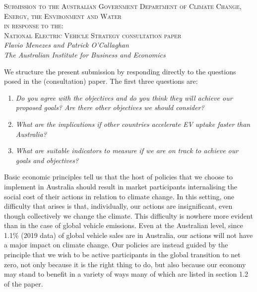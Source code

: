 \documentclass[12pt, draft]{article} \usepackage[shortlabels]{enumitem}
\begin{document}
\begin{centering}
  \textsc{Submission to the Australian Government Department of Climate Change,
  Energy, the Environment and Water\\ in response to the:\\
  National Electric Vehicle Strategy consultation paper}\\
\vskip10pt
  \emph{Flavio Menezes and Patrick O'Callaghan\\
  The Australian Institute for Business and Economics}\\
\end{centering}
\vskip20pt

We structure the present submission by responding directly to the
questions posed in the (consultation) paper. The first three questions are: 

\begin{enumerate}
 
  \item \emph{Do you agree with the objectives and do you think
      they will achieve our proposed goals? Are there other objectives we
      should consider?}

  \item \emph{What are the implications if other countries accelerate EV
    uptake faster than Australia?}

  \item \emph{What are suitable indicators to measure if we are on track to
    achieve our goals and objectives?}

\end{enumerate}

Basic economic principles tell us that the host of policies that we choose to
implement in Australia should result in market participants internalising the
social cost of their actions in relation to climate change. In this setting,
one difficulty that arises is that, individually, our actions are
insignificant, even though collectively we change the climate.  This difficulty
is nowhere more evident than in the case of global vehicle emissions.  Even at
the Australian level, since 1.1\% (2019 data) of global vehicle sales are in
Australia, our actions will not have a major impact on climate change. Our
policies are instead guided by the principle that we wish to be active
participants in the global transition to net zero, not only because it is the
right thing to do, but also because our economy may stand to benefit in a
variety of ways many of which are listed in section 1.2 of the paper.
\end{document}
